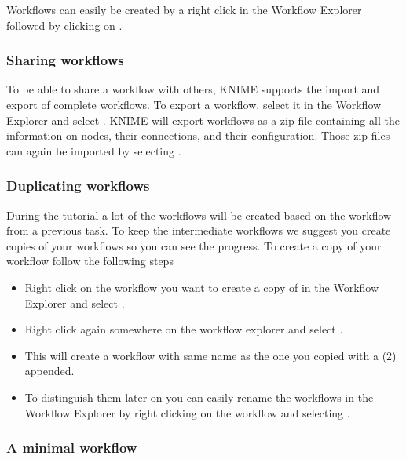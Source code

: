Workflows can easily be created by a right click in the Workflow Explorer followed by clicking on .

\subsubsection{Sharing workflows}
\label{sec:sharing_workflows}

To be able to share a workflow with others, KNIME supports the import and export of complete workflows.
To export a workflow, select it in the Workflow Explorer and select .
KNIME will export workflows as a zip file containing all the information on nodes, their connections, and their configuration.
Those zip files can again be imported by selecting .


\subsubsection{Duplicating workflows}
\label{sec:duplicate-wf}

During the tutorial a lot of the workflows will be created based on the workflow from a previous task.
To keep the intermediate workflows we suggest you create copies of your workflows so you can see the progress.
To create a copy of your workflow follow the following steps

\begin{itemize}
\item
Right click on the workflow you want to create a copy of in the Workflow Explorer and select .
\item
Right click again somewhere on the workflow explorer and select .
\item
This will create a workflow with same name as the one you copied with a (2) appended.
\item
To distinguish them later on you can easily rename the workflows in the Workflow Explorer by right clicking on the workflow and selecting . 
\end{itemize}

\subsubsection{A minimal workflow}
\label{Minimal_Workflow}

